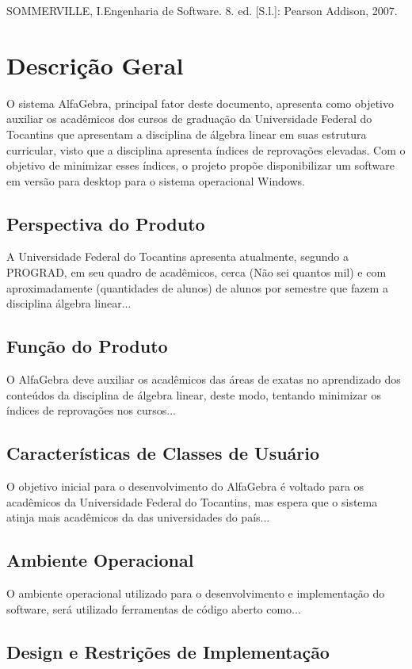 \documentclass{scrreprt}
\begin{document}
\noindent SOMMERVILLE, I.Engenharia de Software. 8. ed. [S.l.]:  Pearson Addison, 2007.

\chapter{Descrição Geral}
O sistema AlfaGebra, principal fator deste documento, apresenta como objetivo auxiliar os acadêmicos dos cursos de graduação da Universidade Federal do Tocantins que apresentam a disciplina de álgebra linear em suas estrutura curricular, visto que a disciplina apresenta índices de reprovações elevadas. Com o objetivo de minimizar esses índices, o projeto propõe disponibilizar um software em versão para desktop para o sistema operacional Windows.

\section{Perspectiva do Produto}
A Universidade Federal do Tocantins apresenta atualmente, segundo a PROGRAD, em seu quadro de acadêmicos, cerca (Não sei quantos mil) e com aproximadamente (quantidades de alunos) de alunos por semestre que fazem a disciplina álgebra linear...

\section{Função do Produto}
O AlfaGebra deve auxiliar os acadêmicos das áreas de exatas no aprendizado dos conteúdos da disciplina de álgebra linear, deste modo, tentando minimizar os índices de reprovações nos cursos...

\section{Características de Classes de Usuário}
O objetivo inicial para o desenvolvimento do AlfaGebra é voltado para os acadêmicos da Universidade Federal do Tocantins, mas espera que o sistema atinja mais acadêmicos da das universidades do país...

\section{Ambiente Operacional}
O ambiente operacional utilizado para o desenvolvimento e implementação do software, será utilizado ferramentas de código aberto como...

\section{Design e Restrições de Implementação}
\end{document}
